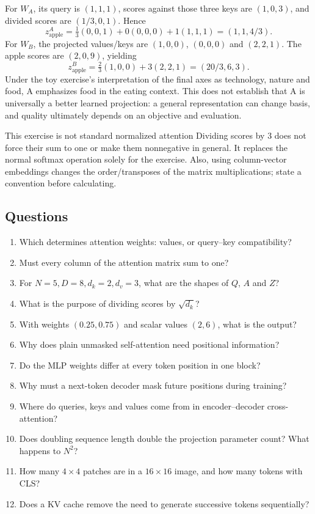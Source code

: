 \documentclass[11pt]{article}
\begin{document}
For $W_A$, its query is $(1,1,1)$, scores against those three keys are $(1,0,3)$, and divided scores are $(1/3,0,1)$. Hence
\[
z_{\mathrm{apple}}^{A}
=\tfrac13(0,0,1)+0(0,0,0)+1(1,1,1)
=(1,1,4/3).
\]
For $W_B$, the projected values/keys are $(1,0,0)$, $(0,0,0)$ and $(2,2,1)$. The apple scores are $(2,0,9)$, yielding
\[
z_{\mathrm{apple}}^{B}
=\tfrac23(1,0,0)+3(2,2,1)
=(20/3,6,3).
\]
Under the toy exercise's interpretation of the final axes as technology, nature and food, A emphasizes food in the eating context. This does not establish that A is universally a better learned projection: a general representation can change basis, and quality ultimately depends on an objective and evaluation.
\begin{careful}{This exercise is not standard normalized attention}
Dividing scores by 3 does not force their sum to one or make them nonnegative in general. It replaces the normal softmax operation solely for the exercise. Also, using column-vector embeddings changes the order/transposes of the matrix multiplications; state a convention before calculating.
\end{careful}

\subsection{Questions}
\begin{enumerate}
\item Which determines attention weights: values, or query--key compatibility?
\item Must every column of the attention matrix sum to one?
\item For $N=5,D=8,d_k=2,d_v=3$, what are the shapes of $Q$, $A$ and $Z$?
\item What is the purpose of dividing scores by $\sqrt{d_k}$?
\item With weights $(0.25,0.75)$ and scalar values $(2,6)$, what is the output?
\item Why does plain unmasked self-attention need positional information?
\item Do the MLP weights differ at every token position in one block?
\item Why must a next-token decoder mask future positions during training?
\item Where do queries, keys and values come from in encoder--decoder cross-attention?
\item Does doubling sequence length double the projection parameter count? What happens to $N^2$?
\item How many $4\times4$ patches are in a $16\times16$ image, and how many tokens with CLS?
\item Does a KV cache remove the need to generate successive tokens sequentially?
\end{enumerate}
\end{document}
